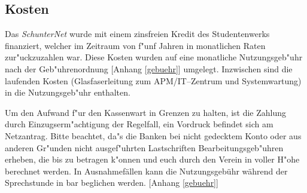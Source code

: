 
\subsection{Kosten}

Das \emph{SchunterNet} wurde mit einem zinsfreien Kredit des Studentenwerks
finanziert, welcher im Zeitraum von f"unf Jahren in monatlichen Raten
zur"uckzuzahlen war. Diese Kosten wurden auf eine monatliche Nutzungsgeb"uhr
nach der Geb"uhrenordnung [Anhang \ref{gebuehr}] umgelegt. Inzwischen sind die laufenden Kosten 
(Glasfaserleitung zum APM/IT--Zentrum und Systemwartung) in die Nutzungsgeb"uhr enthalten. 

Um den Aufwand f"ur den Kassenwart in Grenzen zu halten, ist die Zahlung durch 
Einzugserm"achtigung der Regelfall, ein Vordruck befindet sich am Netzantrag.
Bitte beachtet, da"s die Banken bei nicht gedecktem Konto oder aus anderen
Gr"unden nicht ausgef"uhrten Lastschriften Bearbeitungsgeb"uhren erheben, die bis
zu  betragen k"onnen und euch durch den Verein in voller H"ohe
berechnet werden. In Ausnahmefällen kann die Nutzungsgebühr während der \glossar Sprechstunde in bar 
beglichen werden. [Anhang \ref{gebuehr}]